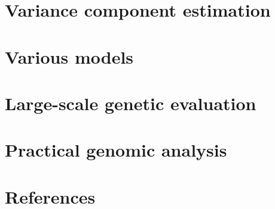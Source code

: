 \documentclass[letterpaper,oneside,10pt]{scrbook}
\begin{document}
\chapter{Variance component estimation}





\chapter{Various models}



























\chapter{Large-scale genetic evaluation}






\chapter{Practical genomic analysis}







\backmatter

\chapter{References}




\end{document}
